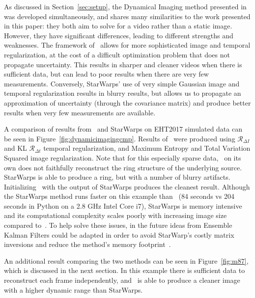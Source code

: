 As discussed in Section~\ref{sec:setup}, the Dynamical Imaging method presented in~\cite{Johnson_dynamical} was developed simultaneously, and shares many similarities to the work presented in this paper: they both aim to solve for a video rather than a static image. However, they have significant differences, leading to different strengths and weaknesses. The framework of~\cite{Johnson_dynamical} allows for more sophisticated image and temporal regularization, at the cost of a difficult optimization problem that does not propagate uncertainty. This results in sharper and cleaner videos when there is sufficient data, but can lead to poor results when there are very few measurements. 
Conversely, StarWarps' use of very simple Gaussian image and temporal regularization results in blurry results, but allows us to propagate an approximation of uncertainty (through the covariance matrix) and produce better results when very few measurements are available.

A comparison of results from~\cite{Johnson_dynamical} and StarWarps on EHT2017 simulated data can be seen in Figure~\ref{fig:dynamicimagingcmp}. Results of~\cite{Johnson_dynamical} were produced using $\mathcal{R}_{\Delta I}$ and KL $\mathcal{R}_{\Delta t}$ temporal regularization, and Maximum Entropy and Total Variation Squared image regularization. Note that for this especially sparse data,~\cite{Johnson_dynamical} on its own does not faithfully reconstruct the ring structure of the underlying source. StarWarps is able to produce a ring, but with a number of blurry artifacts. Initializing~\cite{Johnson_dynamical} with the output of StarWarps produces the cleanest result. 
Although the StarWarps method runs faster on this example than~\cite{Johnson_dynamical} (84 seconds vs 204 seconds in Python on a 2.8 GHz Intel Core i7), StarWarps is memory intensive and its computational complexity scales poorly with increasing image size compared to~\cite{Johnson_dynamical}.  
To help solve these issues, in the future ideas from Ensemble Kalman Filters could be adapted in order to avoid StarWarp's costly matrix inversions and reduce the method's memory footprint~\cite{evensen2003ensemble}.  

An additional result comparing the two methods can be seen in Figure~\ref{fig:m87}, which is discussed in the next section. In this example there is sufficient data to reconstruct each frame independently, and~\cite{Johnson_dynamical} is able to produce a cleaner image with a higher dynamic range than StarWarps. 

